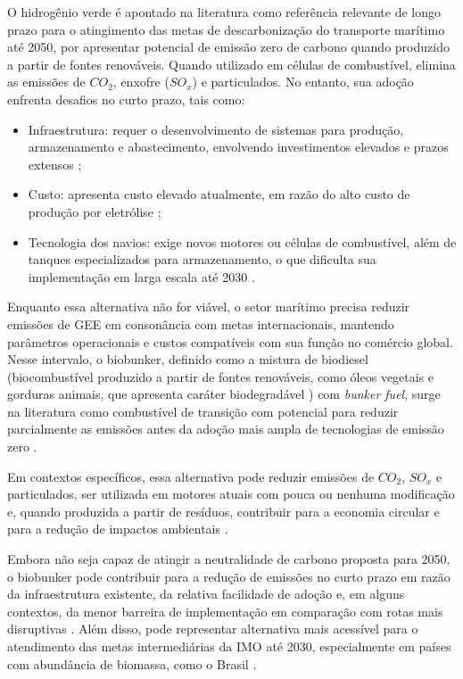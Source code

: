 O hidrogênio verde é apontado na literatura como referência relevante de longo prazo para o atingimento das metas de descarbonização do transporte marítimo até 2050, por apresentar potencial de emissão zero de carbono quando produzido a partir de fontes renováveis. Quando utilizado em células de combustível, elimina as emissões de $CO_2$, enxofre ($SO_x$) e particulados. No entanto, sua adoção enfrenta desafios no curto prazo, tais como:

\begin{itemize}
  \item Infraestrutura: requer o desenvolvimento de sistemas para produção, armazenamento e abastecimento, envolvendo investimentos elevados e prazos extensos \citep{lin_alternative_2023};
  \item Custo: apresenta custo elevado atualmente, em razão do alto custo de produção por eletrólise \citep{hansson_potential_2020};
  \item Tecnologia dos navios: exige novos motores ou células de combustível, além de tanques especializados para armazenamento, o que dificulta sua implementação em larga escala até 2030 \citep{tornatore_ammonia_2022}.
\end{itemize}


Enquanto essa alternativa não for viável, o setor marítimo precisa reduzir emissões de \gls{GEE} em consonância com metas internacionais, mantendo parâmetros operacionais e custos compatíveis com sua função no comércio global. Nesse intervalo, o biobunker, definido como a mistura de biodiesel (biocombustível produzido a partir de fontes renováveis, como óleos vegetais e gorduras animais, que apresenta caráter biodegradável \citep{paulauskiene_alternative_2019}) com \emph{bunker fuel}, surge na literatura como combustível de transição com potencial para reduzir parcialmente as emissões antes da adoção mais ampla de tecnologias de emissão zero \citep{irena_pathway_2021,roux_review_2024}.

Em contextos específicos, essa alternativa pode reduzir emissões de $CO_2$, $SO_x$ e particulados, ser utilizada em motores atuais com pouca ou nenhuma modificação e, quando produzida a partir de resíduos, contribuir para a economia circular e para a redução de impactos ambientais \citep{bilgili_comparative_2021,altarazi_effects_2022,emaf_towards_2013}.

Embora não seja capaz de atingir a neutralidade de carbono proposta para 2050, o biobunker pode contribuir para a redução de emissões no curto prazo em razão da infraestrutura existente, da relativa facilidade de adoção e, em alguns contextos, da menor barreira de implementação em comparação com rotas mais disruptivas \citep{international_council_on_clean_transportation_potential_2021,altarazi_effects_2022,petzold_operation_2011}. Além disso, pode representar alternativa mais acessível para o atendimento das metas intermediárias da \gls{IMO} até 2030, especialmente em países com abundância de biomassa, como o Brasil \citep{carvalho_biofuels_2021}.

